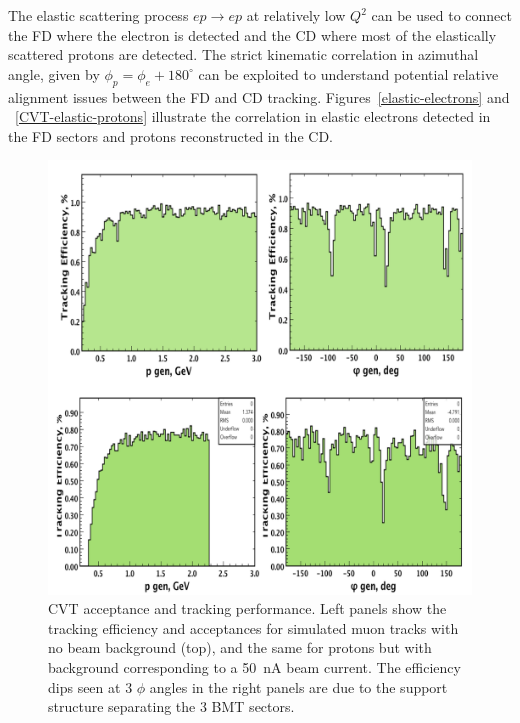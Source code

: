 \documentclass[final,3p,twocolumn]{elsarticle}
\begin{document}
The elastic scattering process $ep \to ep$ at relatively low $Q^2$ can be used to connect the FD where the electron
is detected and the CD where most of the elastically scattered protons are detected. The strict kinematic correlation
in azimuthal angle, given by  $\phi_p = \phi_e + 180^\circ$  can be exploited to understand potential relative alignment
issues between the FD and CD tracking. Figures~\ref{elastic-electrons} and ~\ref{CVT-elastic-protons} illustrate the
correlation in elastic electrons detected in the FD sectors and protons reconstructed in the CD. 

\begin{figure}[t!]
\centerline{\includegraphics[width=1.0\columnwidth]{cvt-acceptance.png}}
\caption{CVT acceptance and tracking performance. Left panels show the tracking efficiency and acceptances
  for simulated muon tracks with no beam background (top), and the same for protons but with background
  corresponding to a 50~nA beam current. The efficiency dips seen at 3 $\phi$ angles in the right panels are due
  to the support structure separating the 3 BMT sectors.}
\label{cvt-acceptance}

\end{figure}
\end{document}
